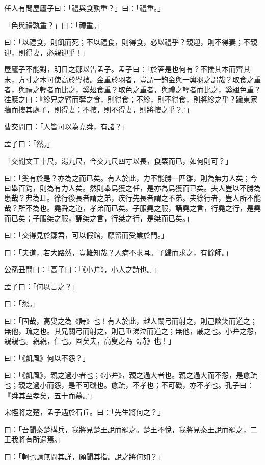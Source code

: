 
\begin{pinyinscope}
任人有問屋廬子曰：「禮與食孰重？」曰：「禮重。」

「色與禮孰重？」曰：「禮重。」

曰：「以禮食，則飢而死；不以禮食，則得食，必以禮乎？親迎，則不得妻；不親迎，則得妻，必親迎乎！」

屋廬子不能對，明日之鄒以告孟子。孟子曰：「於答是也何有？不揣其本而齊其末，方寸之木可使高於岑樓。金重於羽者，豈謂一鉤金與一輿羽之謂哉？取食之重者，與禮之輕者而比之，奚翅食重？取色之重者，與禮之輕者而比之，奚翅色重？往應之曰：『紾兄之臂而奪之食，則得食；不紾，則不得食，則將紾之乎？踰東家牆而摟其處子，則得妻；不摟，則不得妻，則將摟之乎？』」

曹交問曰：「人皆可以為堯舜，有諸？」

孟子曰：「然。」

「交聞文王十尺，湯九尺，今交九尺四寸以長，食粟而已，如何則可？」

曰：「奚有於是？亦為之而已矣。有人於此，力不能勝一匹雛，則為無力人矣；今曰舉百鈞，則為有力人矣。然則舉烏獲之任，是亦為烏獲而已矣。夫人豈以不勝為患哉？弗為耳。徐行後長者謂之弟，疾行先長者謂之不弟。夫徐行者，豈人所不能哉？所不為也。堯舜之道，孝弟而已矣。子服堯之服，誦堯之言，行堯之行，是堯而已矣；子服桀之服，誦桀之言，行桀之行，是桀而已矣。」

曰：「交得見於鄒君，可以假館，願留而受業於門。」

曰：「夫道，若大路然，豈難知哉？人病不求耳。子歸而求之，有餘師。」

公孫丑問曰：「高子曰：『《小弁》，小人之詩也。』」

孟子曰：「何以言之？」

曰：「怨。」

曰：「固哉，高叟之為《詩》也！有人於此，越人關弓而射之，則己談笑而道之；無他，疏之也。其兄關弓而射之，則己垂涕泣而道之；無他，戚之也。小弁之怨，親親也。親親，仁也。固矣夫，高叟之為《詩》也！」

曰：「《凱風》何以不怨？」

曰：「《凱風》，親之過小者也；《小弁》，親之過大者也。親之過大而不怨，是愈疏也；親之過小而怨，是不可磯也。愈疏，不孝也；不可磯，亦不孝也。孔子曰：『舜其至孝矣，五十而慕。』」

宋牼將之楚，孟子遇於石丘。曰：「先生將何之？」

曰：「吾聞秦楚構兵，我將見楚王說而罷之。楚王不悅，我將見秦王說而罷之，二王我將有所遇焉。」

曰：「軻也請無問其詳，願聞其指。說之將何如？」


\end{pinyinscope}
